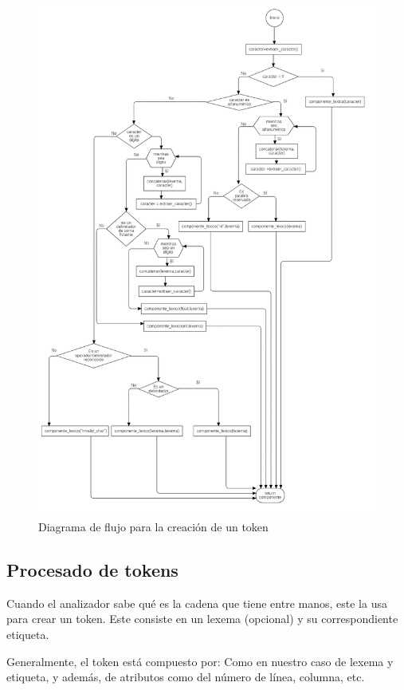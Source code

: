 \documentclass[a4paper,twocolumn]{article}
\begin{document}
    \clearpage
    \begin{figure}
        \centering
        \includegraphics[width=1.00\linewidth]{diagramaFlujoDecisionCaracteresFinal}
        \caption{Diagrama de flujo para la creación de un token}
        \label{fig:diag 1}
    \end{figure}

    \subsection{Procesado de tokens}\label{subsec:pdtk}
    Cuando el analizador sabe qué es la cadena que tiene entre manos, este la usa para crear un token.
    Este consiste en un lexema (opcional) y su correspondiente etiqueta.

    Generalmente, el token está compuesto por: Como en nuestro caso de lexema y etiqueta, y además, de atributos como del número de línea, columna, etc.
\end{document}
